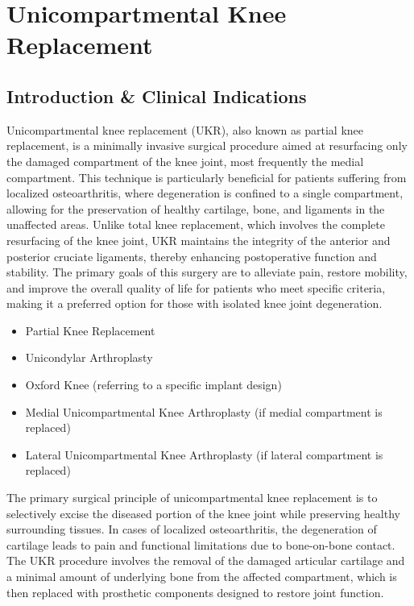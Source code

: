 \chapter{Unicompartmental Knee Replacement}

\section*{Introduction \& Clinical Indications}
Unicompartmental knee replacement (UKR), also known as partial knee replacement, is a minimally invasive surgical procedure aimed at resurfacing only the damaged compartment of the knee joint, most frequently the medial compartment. This technique is particularly beneficial for patients suffering from localized osteoarthritis, where degeneration is confined to a single compartment, allowing for the preservation of healthy cartilage, bone, and ligaments in the unaffected areas. Unlike total knee replacement, which involves the complete resurfacing of the knee joint, UKR maintains the integrity of the anterior and posterior cruciate ligaments, thereby enhancing postoperative function and stability. The primary goals of this surgery are to alleviate pain, restore mobility, and improve the overall quality of life for patients who meet specific criteria, making it a preferred option for those with isolated knee joint degeneration.

\begin{itemize}
  \item Partial Knee Replacement
  \item Unicondylar Arthroplasty
  \item Oxford Knee (referring to a specific implant design)
  \item Medial Unicompartmental Knee Arthroplasty (if medial compartment is replaced)
  \item Lateral Unicompartmental Knee Arthroplasty (if lateral compartment is replaced)
\end{itemize}

The primary surgical principle of unicompartmental knee replacement is to selectively excise the diseased portion of the knee joint while preserving healthy surrounding tissues. In cases of localized osteoarthritis, the degeneration of cartilage leads to pain and functional limitations due to bone-on-bone contact. The UKR procedure involves the removal of the damaged articular cartilage and a minimal amount of underlying bone from the affected compartment, which is then replaced with prosthetic components designed to restore joint function.

